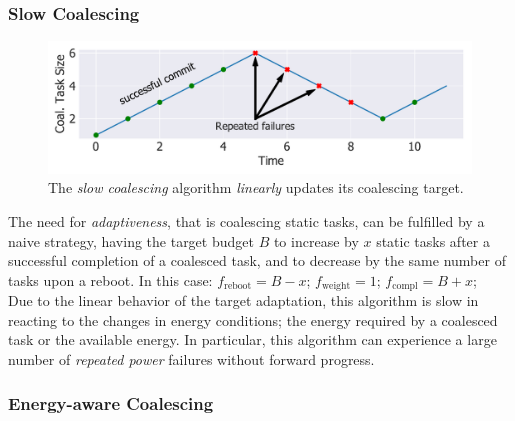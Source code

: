 \subsubsection{Slow Coalescing}
\label{subsec:slowCoalescing}

\begin{figure}
	\centering
	\includegraphics[width=0.5\columnwidth]{figures/slowCoal}
	\caption{The {\em slow coalescing} algorithm \emph{linearly} updates its coalescing target.}
	\label{fig:slowCoal}
\end{figure}

The need for \emph{adaptiveness}, that is coalescing static tasks, can be fulfilled by a naive strategy, having the target budget $B$ to increase by $x$ static tasks after a successful completion of a coalesced task, and to decrease by the same number of tasks upon a reboot. In this case: $f_\text{reboot} = B - x$; $f_\text{weight} =  1$; $f_\text{compl} = B + x$; \\
Due to the linear behavior of the target adaptation, this algorithm is slow in reacting to the changes in energy conditions; the energy required by a coalesced task or the available energy. In particular, this algorithm can experience a large number of \emph{repeated power} failures without forward progress.

\subsubsection{Energy-aware Coalescing}
\label{subsec:ECoalescing}



